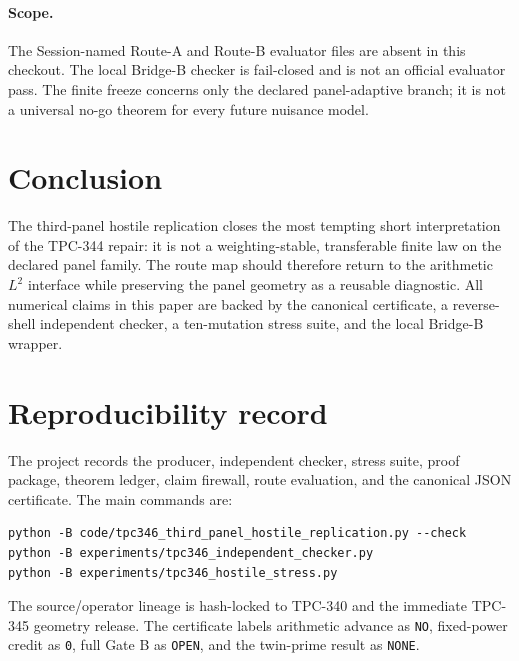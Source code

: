 \documentclass[10pt]{article}
\begin{document}
\paragraph{Scope.}
The Session-named Route-A and Route-B evaluator files are absent in this
checkout.  The local Bridge-B checker is fail-closed and is not an official
evaluator pass.  The finite freeze concerns only the declared
panel-adaptive branch; it is not a universal no-go theorem for every future
nuisance model.

\section{Conclusion}

The third-panel hostile replication closes the most tempting short
interpretation of the TPC-344 repair: it is not a weighting-stable,
transferable finite law on the declared panel family.  The route map should
therefore return to the arithmetic $L^2$ interface while preserving the
panel geometry as a reusable diagnostic.  All numerical claims in this
paper are backed by the canonical certificate, a reverse-shell independent
checker, a ten-mutation stress suite, and the local Bridge-B wrapper.

\appendix
\section{Reproducibility record}

The project records the producer, independent checker, stress suite, proof
package, theorem ledger, claim firewall, route evaluation, and the canonical
JSON certificate.  The main commands are:

\begin{verbatim}
python -B code/tpc346_third_panel_hostile_replication.py --check
python -B experiments/tpc346_independent_checker.py
python -B experiments/tpc346_hostile_stress.py
\end{verbatim}

The source/operator lineage is hash-locked to TPC-340 and the immediate
TPC-345 geometry release.  The certificate labels arithmetic advance as
\texttt{NO}, fixed-power credit as \texttt{0}, full Gate B as
\texttt{OPEN}, and the twin-prime result as \texttt{NONE}.
\end{document}
